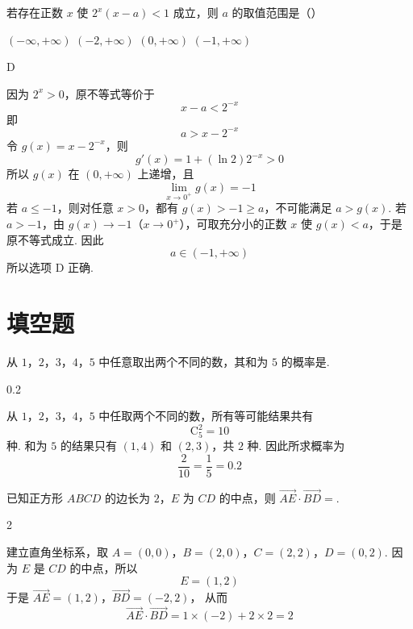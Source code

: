 \begin{problem}
若存在正数 \(x\) 使 \(2^{x} (x - a) < 1\) 成立，则 \(a\) 的取值范围是（\quad）

\choices
    {\((- \infty, + \infty)\)}
    {\((-2, +\infty)\)}
    {\((0, +\infty)\)}
    {\((-1, +\infty)\)}
\end{problem}

\begin{answer}
D
\end{answer}

\begin{solution}
因为 \(2^x>0\)，原不等式等价于
\[
x-a<2^{-x}
\]
即
\[
a>x-2^{-x}
\]
令 \(g(x)=x-2^{-x}\)，则
\[
g'(x)=1+(\ln2)2^{-x}>0
\]
所以 \(g(x)\) 在 \((0,+\infty)\) 上递增，且
\[
\lim_{x\to0^+}g(x)=-1
\]
若 \(a\leqslant-1\)，则对任意 \(x>0\)，都有 \(g(x)>-1\geqslant a\)，不可能满足 \(a>g(x)\). 若 \(a>-1\)，由 \(g(x)\to-1\)（\(x\to0^+\)），可取充分小的正数 \(x\) 使 \(g(x)<a\)，于是原不等式成立. 因此
\[
a\in(-1,+\infty)
\]
所以选项 D 正确.
\end{solution}

\section{填空题}

\begin{problem}
从 \(1\)，\(2\)，\(3\)，\(4\)，\(5\) 中任意取出两个不同的数，其和为 \(5\) 的概率是\fillinblank{}.
\end{problem}

\begin{answer}
0.2
\end{answer}

\begin{solution}
从 \(1\)，\(2\)，\(3\)，\(4\)，\(5\) 中任取两个不同的数，所有等可能结果共有
\[
\mathrm C_5^2=10
\]
种. 和为 \(5\) 的结果只有 \((1,4)\) 和 \((2,3)\)，共 \(2\) 种. 因此所求概率为
\[
\frac{2}{10}=\frac15=0.2
\]
\end{solution}

\begin{problem}
已知正方形 \(ABCD\) 的边长为 \(2\)，\(E\) 为 \(CD\) 的中点，则 \(\overrightarrow{AE} \cdot \overrightarrow{BD} =\)\fillinblank{}.
\end{problem}

\begin{answer}
2
\end{answer}

\begin{solution}
建立直角坐标系，取 \(A=(0,0)\)，\(B=(2,0)\)，\(C=(2,2)\)，\(D=(0,2)\). 因为 \(E\) 是 \(CD\) 的中点，所以
\[
E=(1,2)
\]
于是 \(\overrightarrow{AE}=(1,2)\)，\(\overrightarrow{BD}=(-2,2)\)，
从而
\[
\overrightarrow{AE}\cdot\overrightarrow{BD}=1\times(-2)+2\times2=2
\]
\end{solution}

